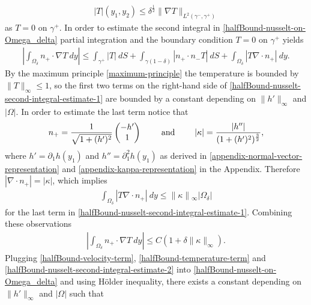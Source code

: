 \documentclass{article}
\theoremstyle{definition}
\theoremstyle{definition}
\begin{document}
\begin{align}
    \label{halfBound-temperature-term}
    |T|(y_1,y_2) \leq \delta^\frac{1}{2} \| \nabla T\|_{L^2(\gamma^-,\gamma^+)}
\end{align}
as $T=0$ on $\gamma^+$. In order to estimate the second integral in \eqref{halfBound-nusselt-on-Omega_delta} partial integration and the boundary condition $T=0$ on $\gamma^+$ yields
\begin{align}
    \label{halfBound-nusselt-second-integral-estimate-1}
    \left|\int_{\Omega_\delta} n_+\cdot \nabla T \ dy \right| \leq \int_{\gamma^+} |T| \ dS+ \int_{\gamma(1-\delta)} |n_+\cdot n_- T| \ dS + \int_{\Omega_\delta} |T\nabla \cdot n_+ | \ dy.
\end{align}
By the maximum principle \eqref{maximum-principle} the temperature is bounded by $\|T\|_\infty \leq 1$, so the first two terms on the right-hand side of \eqref{halfBound-nusselt-second-integral-estimate-1} are bounded by a constant depending on $\|h'\|_{\infty}$ and $|\Omega|$. In order to estimate the last term notice that
\begin{align*}
    n_+=\frac{1}{\sqrt{1+(h')^2}}\begin{pmatrix}-h'\\1\end{pmatrix}\qquad \textnormal{ and }\qquad |\kappa| = \frac{|h''|}{(1+(h')^2)^\frac{3}{2}},
\end{align*}
where $h'=\partial_1 h(y_1)$ and $h''= \partial_1^2h(y_1)$ as derived in \eqref{appendix-normal-vector-representation} and \eqref{appendix-kappa-representation} in the Appendix. Therefore $|\nabla\cdot n_+ |=|\kappa|$, which implies
\begin{align*}
    \int_{\Omega_\delta} |T\nabla \cdot n_+ | \ dy \leq \|\kappa\|{_\infty}|\Omega_\delta|
\end{align*}
for the last term in \eqref{halfBound-nusselt-second-integral-estimate-1}.
Combining these observations
\begin{align}
    \label{halfBound-nusselt-second-integral-estimate-2}
    \left|\int_{\Omega_\delta} n_+\cdot \nabla T \ dy \right| \leq C (1+\delta \|\kappa\|_\infty).
\end{align}
Plugging \eqref{halfBound-velocity-term}, \eqref{halfBound-temperature-term} and \eqref{halfBound-nusselt-second-integral-estimate-2} into \eqref{halfBound-nusselt-on-Omega_delta} and using Hölder inequality, there exists a constant depending on $\|h'\|_{\infty}$ and $|\Omega|$ such that
\end{document}
